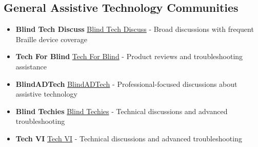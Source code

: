 \subsection{General Assistive Technology Communities}
\label{app2:at-communities}
\begin{itemize}
	\item \textbf{Blind Tech Discuss} \href{https://groups.io/g/blindtechdiscuss}{Blind Tech Discuss} - Broad  discussions with frequent Braille device coverage
	\item \textbf{Tech For Blind} \href{https://groups.io/g/tech-for-blind}{Tech For Blind} - Product reviews and troubleshooting assistance
	\item \textbf{BlindADTech} \href{https://groups.io/g/blindadtech}{BlindADTech} - Professional-focused discussions about assistive technology
	\item \textbf{Blind Techies} \href{https://groups.io/g/blind-techies}{Blind Techies} - Technical discussions and advanced troubleshooting
	\item \textbf{Tech VI} \href{https://groups.io/g/tech-vi}{Tech VI} - Technical discussions and advanced troubleshooting
\end{itemize}

